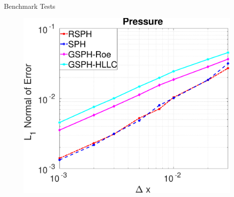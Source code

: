 \documentclass{beamer}
\begin{document}
\begin{frame}{Benchmark Tests}
\begin{figure}
    \begin{minipage}{.3 \textwidth}
        \centering
        \includegraphics[width=0.95 \textwidth]{./Chapter-4/Figures/Accuracy-pre}
    \end{minipage}%
\end{figure}     
\end{frame}
%
\end{document}
